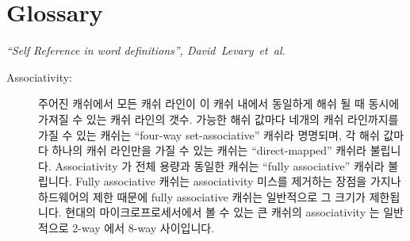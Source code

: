 
\chapter{Glossary}
%
	 {\emph{``Self Reference in word definitions'',
	        David~Levary~et~al.}}

\begin{description}
\item[Associativity:]
	주어진 캐쉬에서 모든 캐쉬 라인이 이 캐쉬 내에서 동일하게 해쉬 될 때
	동시에 가져질 수 있는 캐쉬 라인의 갯수.
	가능한 해쉬 값마다 네개의 캐쉬 라인까지를 가질 수 있는 캐쉬는
	``four-way set-associative'' 캐쉬라 명명되며, 각 해쉬 값마다 하나의
	캐쉬 라인만을 가질 수 있는 캐쉬는 ``direct-mapped'' 캐쉬라 불립니다.
	Associativity 가 전체 용량과 동일한 캐쉬는 ``fully associative'' 캐쉬라
	불립니다.
	Fully associative 캐쉬는 associativity 미스를 제거하는 장점을 가지나
	하드웨어의 제한 때문에 fully associative 캐쉬는 일반적으로 그 크기가
	제한됩니다.
	현대의 마이크로프로세서에서 볼 수 있는 큰 캐쉬의 associativity 는
	일반적으로 2-way 에서 8-way 사이입니다.

\iffalse

\item[Associativity:]\index{Associativity}
	The number of cache lines that can be held simultaneously in
	a given cache, when all of these cache lines hash identically
	in that cache.
	A cache that could hold four cache lines for each possible
	hash value would be termed a ``four-way set-associative'' cache,
	while a cache that could hold only one cache line for each
	possible hash value would be termed a ``direct-mapped'' cache.
	A cache whose associativity was equal to its capacity would
	be termed a ``fully associative'' cache.
	Fully associative caches have the advantage of eliminating
	associativity misses, but, due to hardware limitations,
	fully associative caches are normally quite limited in size.
	The associativity of the large caches found on modern microprocessors
	typically range from two-way to eight-way.

\fi


\end{description}
